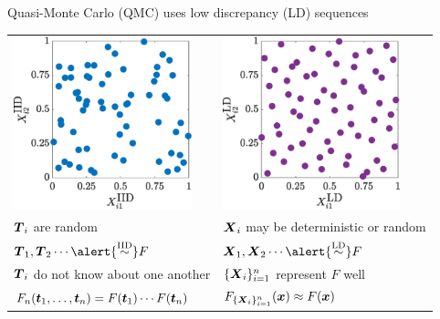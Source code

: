 \documentclass[11pt,compress,xcolor={usenames,dvipsnames},aspectratio=169]{beamer}
\begin{document}
\begin{frame}{Quasi-Monte Carlo (QMC) uses low discrepancy (LD) sequences}
\vspace{-3ex}
\begin{tabular}{>{\centering}p{}@{\quad}>{\centering}p{}}
\includegraphics[height=5cm]{ProgramsImages/IIDPoints.eps} &
\includegraphics[height=5cm]{ProgramsImages/SSobolPoints.eps}
\tabularnewline
$\boldsymbol{T}_i$ are random &
$\boldsymbol{X}_i$ may be deterministic \alert{or} random 
\tabularnewline
$\vT_1, \vT_2 \cdots \alert{\IIDsim} F$ &
$\vX_1, \vX_2 \cdots \alert{\LDsim} F$ 
\tabularnewline
$\boldsymbol{T}_i$ do not know about one another &
$\{\boldsymbol{X}_i\}_{i=1}^n$ represent $F$ well
\tabularnewline
$F_{n}(\boldsymbol{t}_1, \ldots, \boldsymbol{t}_n) = F(\boldsymbol{t}_1) \cdots F(\boldsymbol{t}_n)$ &
$F_{\{\boldsymbol{X}_i\}_{i=1}^n}(\boldsymbol{x}) \approx F(\boldsymbol{x})$
\end{tabular}
\end{frame}
\end{document}
